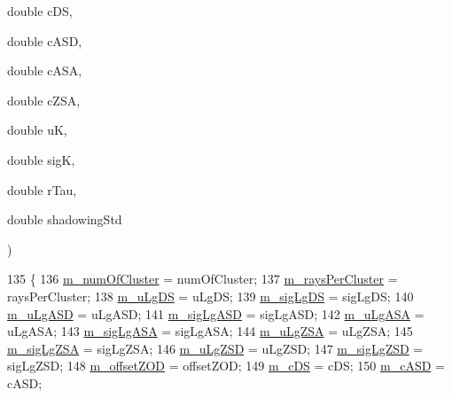{\begin{DoxyParamCaption}
\item[{double}]{c\+DS, }
\item[{double}]{c\+A\+SD, }
\item[{double}]{c\+A\+SA, }
\item[{double}]{c\+Z\+SA, }
\item[{double}]{uK, }
\item[{double}]{sigK, }
\item[{double}]{r\+Tau, }
\item[{double}]{shadowing\+Std}
\end{DoxyParamCaption}
)\hspace{0.3cm}{\ttfamily [inline]}}\hypertarget{structns3_1_1ParamsTable_a1b14a2f6bb3f1f76f575b9cc784ba62c}{}\label{structns3_1_1ParamsTable_a1b14a2f6bb3f1f76f575b9cc784ba62c}

\begin{DoxyCode}
135         \{
136                 \hyperlink{structns3_1_1ParamsTable_ad6857120c0e337f2b70ddb1220e056a1}{m\_numOfCluster} = numOfCluster;
137                 \hyperlink{structns3_1_1ParamsTable_a45f11bf78732c417a8c33cf11e887a90}{m\_raysPerCluster} = raysPerCluster;
138                 \hyperlink{structns3_1_1ParamsTable_a3030eaa717d9e9a95a794275eea84315}{m\_uLgDS} = uLgDS;
139                 \hyperlink{structns3_1_1ParamsTable_a3160d639fe7b7ffd4251fa84a3ad5538}{m\_sigLgDS} = sigLgDS;
140                 \hyperlink{structns3_1_1ParamsTable_a3a934456a3f01f37f95e05e9cbb8b0ec}{m\_uLgASD} = uLgASD;
141                 \hyperlink{structns3_1_1ParamsTable_a4ab3fb6632950b1227ca5b099015439b}{m\_sigLgASD} = sigLgASD;
142                 \hyperlink{structns3_1_1ParamsTable_ab1c95658524a112d994747b0d4868267}{m\_uLgASA} = uLgASA;
143                 \hyperlink{structns3_1_1ParamsTable_afed489b323efb00d9bdd0f85c9dffa2f}{m\_sigLgASA} = sigLgASA;
144                 \hyperlink{structns3_1_1ParamsTable_ad4d908238af248378b5118ee4b73a83a}{m\_uLgZSA} = uLgZSA;
145                 \hyperlink{structns3_1_1ParamsTable_a39d8bc22ece7d8c1cf9cf338f38784d6}{m\_sigLgZSA} = sigLgZSA;
146                 \hyperlink{structns3_1_1ParamsTable_aae35745f216dbbd1ea226b542ab0d944}{m\_uLgZSD} = uLgZSD;
147                 \hyperlink{structns3_1_1ParamsTable_aeb4aca1e62558a55afaa23f22bdc496c}{m\_sigLgZSD} = sigLgZSD;
148                 \hyperlink{structns3_1_1ParamsTable_a4104ad3bbe3898d4dfc05de29bb5fa31}{m\_offsetZOD} = offsetZOD;
149                 \hyperlink{structns3_1_1ParamsTable_afaf471e810a6d0b40dba8d682eae6f41}{m\_cDS} = cDS;
150                 \hyperlink{structns3_1_1ParamsTable_a0f9954987c6a0999ee1d95ec016a80dc}{m\_cASD} = cASD;

\end{DoxyCode}
